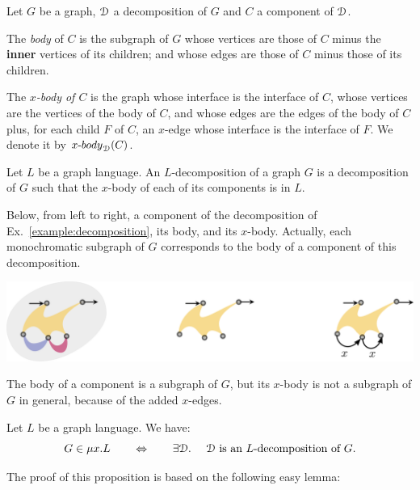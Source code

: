  \begin{definition}
Let $G$ be a graph, $\mathcal D$ a decomposition of $G$ and $C$ a component of $\mathcal D$. 
\smallskip

The \emph{body} of $C$ is the subgraph of $G$ whose vertices are those of $C$ minus the \textbf{inner} vertices of its children; and whose edges are those of $C$ minus those of its children.  
\smallskip

The \emph{$x$-body of $C$} is the graph whose interface is the interface of $C$, whose vertices are the vertices of the body of $C$, and whose edges are the edges of the body of $C$ plus, for each child $F$ of $C$, an $x$-edge whose interface is the interface of $F$.  We denote it  by $x\text{-}\mathsf{body}_\cD(C)$.
\end{definition}

\begin{definition}[$L$-decompositions]
Let $L$ be a graph language. An $L$-decomposition of a graph $G$ is a decomposition of $G$ such that the $x$-body of each of its components is in $L$.
\end{definition}

\begin{example}
Below, from left to right, a component of the decomposition of Ex.~\ref{example:decomposition}, its body, and its $x$-body. Actually, each monochromatic subgraph of $G$ corresponds to the body of a  component of this decomposition.
\begin{center}
\includegraphics[scale=.10]{Pictures/body}
\end{center}
\end{example}
\begin{remark}
The body of a component is a subgraph of $G$, but its $x$-body is not a subgraph of $G$ in general, because of the added $x$-edges.
\end{remark}


 

\begin{proposition}\label{lem:decomp-iteration}
Let $L$ be a graph language. We have:
$$ G\in \mu x. L \qquad \Leftrightarrow \qquad \exists \mathcal D. \ \quad\mathcal D \text{ is an $L$-decomposition of $G$.}$$
\end{proposition} 
The proof of this proposition is based on the following easy lemma:

